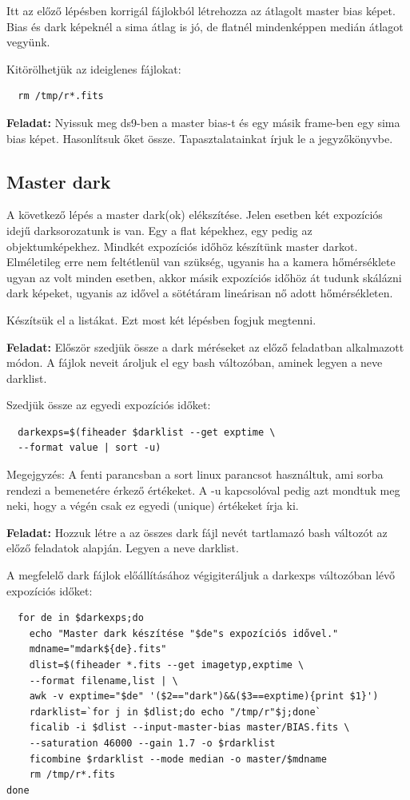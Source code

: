 \documentclass{article}
\begin{document}
Itt az előző lépésben korrigál fájlokból létrehozza az átlagolt master bias
képet. Bias és dark képeknél a sima átlag is jó, de flatnél mindenképpen medián
átlagot vegyünk.

Kitörölhetjük az ideiglenes fájlokat:
\begin{verbatim}
  rm /tmp/r*.fits
\end{verbatim}

{\bf Feladat:}
Nyissuk meg ds9-ben a master bias-t és egy másik frame-ben egy sima bias képet.
Hasonlítsuk őket össze. Tapasztalatainkat írjuk le a jegyzőkönyvbe.


\subsection{Master dark}

A következő lépés a master dark(ok) elékszítése. Jelen esetben két expozíciós
idejű darksorozatunk is van. Egy a flat képekhez, egy pedig az objektumképekhez.
Mindkét expozíciós időhöz készítünk master darkot. Elméletileg erre nem
feltétlenül van szükség, ugyanis ha a kamera hőmérséklete ugyan az volt minden
esetben, akkor másik expozíciós időhöz át tudunk skálázni dark képeket, ugyanis
az idővel a sötétáram lineárisan nő adott hőmérsékleten.

Készítsük el a listákat. Ezt most két lépésben fogjuk megtenni.

{\bf Feladat:}
Először szedjük össze a dark méréseket az előző feladatban alkalmazott módon.
A fájlok neveit ároljuk el egy bash változóban, aminek legyen a neve darklist.

Szedjük össze az egyedi expozíciós időket:
\begin{verbatim}
  darkexps=$(fiheader $darklist --get exptime \
  --format value | sort -u)
\end{verbatim}

Megejgyzés: A fenti parancsban a sort linux parancsot használtuk, ami sorba
rendezi a bemenetére érkező értékeket. A -u kapcsolóval pedig azt mondtuk meg
neki, hogy a végén csak ez egyedi (unique) értékeket írja ki.

{\bf Feladat:}
Hozzuk létre a az összes dark fájl nevét tartlamazó bash változót az előző
feladatok alapján. Legyen a neve darklist.

A megfelelő dark fájlok előállításához végigiteráljuk a darkexps változóban lévő
expozíciós időket:

\begin{verbatim}
  for de in $darkexps;do
    echo "Master dark készítése "$de"s expozíciós idővel."
    mdname="mdark${de}.fits"
    dlist=$(fiheader *.fits --get imagetyp,exptime \
    --format filename,list | \
    awk -v exptime="$de" '($2=="dark")&&($3==exptime){print $1}')
    rdarklist=`for j in $dlist;do echo "/tmp/r"$j;done`
    ficalib -i $dlist --input-master-bias master/BIAS.fits \
    --saturation 46000 --gain 1.7 -o $rdarklist
    ficombine $rdarklist --mode median -o master/$mdname
    rm /tmp/r*.fits
done
\end{verbatim}
\end{document}
